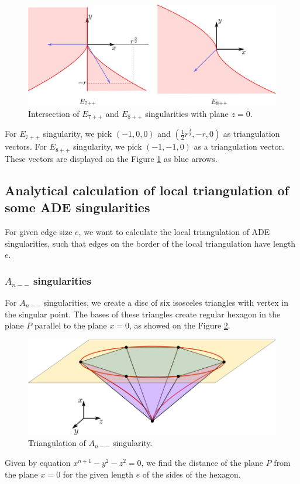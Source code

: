 \begin{figure}
    \centerline{\includegraphics[scale=0.5]{images/img10}}
    \caption[Intersection of $E_{7++}$ and $E_{8++}$ singularities with 
    plane $z=0$.]
    {Intersection of $E_{7++}$ and $E_{8++}$ singularities with 
    plane $z=0$.}
    \label{img:10}
\end{figure}

For $E_{7++}$ singularity, we pick $(-1, 0, 0)$ and 
$(\frac{1}{2}r^{\frac{3}{2}}, -r, 0)$ as triangulation vectors.
For $E_{8++}$ singularity, we pick $(-1, -1, 0)$ as a triangulation vector.
These vectors are displayed on the Figure \ref{img:10} as blue arrows.

\subsection*{Analytical calculation of local triangulation of some ADE singularities}
For given edge size $e$, we want to calculate the local triangulation of ADE
singularities, such that edges on the border of the local triangulation
have length $e$.
\subsubsection*{$A_{n--}$ singularities}
For $A_{n--}$ singularities, we create a disc of six isosceles triangles
with vertex in the singular point. The bases of these triangles create regular
hexagon in the plane $P$ parallel to the plane $x=0$, as showed on the Figure
\ref{img:11}.
\begin{figure}
    \centerline{\includegraphics[scale=0.5]{images/img11}}
    \caption[Triangulation of $A_{n--}$ singularity.]
    {Triangulation of $A_{n--}$ singularity.}
    \label{img:11}
\end{figure}
Given by equation $x^{n+1}-y^2-z^2=0$, we find the distance of the 
plane $P$ from the plane $x=0$ for the given length $e$ of the sides of
the hexagon.

